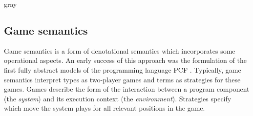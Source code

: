 \documentclass[acmsmall,screen,review,anonymous]{acmart}
\newcommand{\refby}{\preceq}
\newenvironment{optional}{\begin{color}{gray}}{\end{color}}
\begin{document}
\begin{optional}


%
%
%

\end{optional}

\subsection{Game semantics} \label{sec:gamesem} %


Game semantics is a form of denotational semantics which
incorporates some operational aspects.
An early success of this approach was
the formulation of the first fully abstract models
of the programming language PCF \cite{pcfajm,pcfho}.
Typically,
game semantics interpret
types as two-player games
and terms as strategies for these games.
Games describe the form of the interaction
between a program component %
(the \emph{system})
and its execution context
(the \emph{environment}).
Strategies
specify which move the system plays
for all relevant positions in the game.
\end{document}
